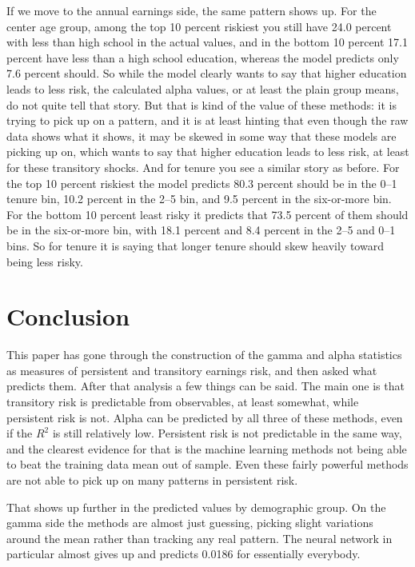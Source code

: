 \documentclass[12pt]{article}
\begin{document}
\begin{onehalfspace}
If we move to the annual earnings side, the same pattern shows up. For the center age group, among the top 10 percent riskiest you still have 24.0 percent with less than high school in the actual values, and in the bottom 10 percent 17.1 percent have less than a high school education, whereas the model predicts only 7.6 percent should. So while the model clearly wants to say that higher education leads to less risk, the calculated alpha values, or at least the plain group means, do not quite tell that story. But that is kind of the value of these methods: it is trying to pick up on a pattern, and it is at least hinting that even though the raw data shows what it shows, it may be skewed in some way that these models are picking up on, which wants to say that higher education leads to less risk, at least for these transitory shocks. And for tenure you see a similar story as before. For the top 10 percent riskiest the model predicts 80.3 percent should be in the 0--1 tenure bin, 10.2 percent in the 2--5 bin, and 9.5 percent in the six-or-more bin. For the bottom 10 percent least risky it predicts that 73.5 percent of them should be in the six-or-more bin, with 18.1 percent and 8.4 percent in the 2--5 and 0--1 bins. So for tenure it is saying that longer tenure should skew heavily toward being less risky.


\section{Conclusion}

This paper has gone through the construction of the gamma and alpha statistics as measures of persistent and transitory earnings risk, and then asked what predicts them. After that analysis a few things can be said. The main one is that transitory risk is predictable from observables, at least somewhat, while persistent risk is not. Alpha can be predicted by all three of these methods, even if the $R^2$ is still relatively low. Persistent risk is not predictable in the same way, and the clearest evidence for that is the machine learning methods not being able to beat the training data mean out of sample. Even these fairly powerful methods are not able to pick up on many patterns in persistent risk.

That shows up further in the predicted values by demographic group. On the gamma side the methods are almost just guessing, picking slight variations around the mean rather than tracking any real pattern. The neural network in particular almost gives up and predicts 0.0186 for essentially everybody.


\end{onehalfspace}
\end{document}
